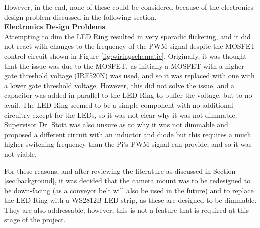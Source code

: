 \vspace{-0.5em}
\noindent
However, in the end, none of these could be considered because of the electronics design problem discussed in the following section. \\
\noindent
\textbf{Electronics Design Problems} \\
Attempting to dim the LED Ring resulted in very sporadic flickering, and it did not react with changes to the frequency of the PWM signal despite the MOSFET control circuit shown in Figure \ref{fig:wiringschematic}.
Originally, it was thought that the issue was due to the MOSFET, as initially a MOSFET with a higher gate threshold voltage (IRF520N) was used, and so it was replaced with one with a lower gate threshold voltage.
However, this did not solve the issue, and a capacitor was added in parallel to the LED Ring to buffer the voltage, but to no avail.
The LED Ring seemed to be a simple component with no additional circuitry except for the LEDs, so it was not clear why it was not dimmable. Supervisor Dr. Stott was also unsure as to why it was not dimmable and proposed a different circuit with an inductor and diode but this requires
a much higher switching frequency than the Pi's PWM signal can provide, and so it was not viable. 

For these reasons, and after reviewing the literature as discussed in Section \ref{sec:background}, it was decided that the camera mount was to be redesigned to be down-facing (as a conveyor belt will also be used in the future)
and to replace the LED Ring with a WS2812B LED strip, as these are designed to be dimmable. They are also addressable, however, this is not a feature that is required at this stage of the project.
